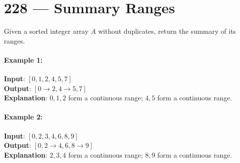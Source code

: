 \section{228 --- Summary Ranges}
Given a sorted integer array $A$ without duplicates, return the summary of its ranges.

\paragraph{Example 1:}

\begin{flushleft}
\textbf{Input}:  $[0,1,2,4,5,7]$
\\
\textbf{Output}: $[0\to2, 4\to5, 7]$
\\
\textbf{Explanation}: $0,1,2$ form a continuous range; $4,5$ form a continuous range.
\end{flushleft}

\paragraph{Example 2:}

\begin{flushleft}
\textbf{Input}:  $[0,2,3,4,6,8,9]$
\\
\textbf{Output}: $[0,2\to4,6,8\to9]$
\\
\textbf{Explanation}: $2,3,4$ form a continuous range; $8,9$ form a continuous range.
\end{flushleft}
